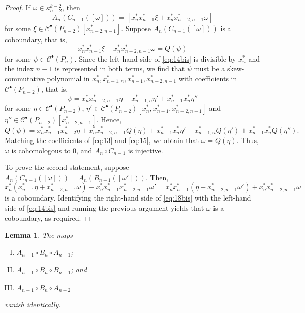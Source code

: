 \documentclass[12pt]{amsart}
\newtheorem{lem}[theorem]{Lemma}
\theoremstyle{definition}
\begin{document}
\begin{proof}
If $\omega\in \kappa_{n-2}^{k-2}$, then 
\begin{equation}\label{eq:13}
A_n(C_{n-1}([\omega])) = [x_n^*x_{n-1}^*\xi+x_n^*x_{n-2,n-1}^*\omega]
\end{equation}
for some $\xi\in \mathcal C^\bullet(P_{n-2})[x_{n-2,n-1}^*]$. Suppose $A_n(C_{n-1}([\omega]))$ is a coboundary, that is, 
\begin{equation}\label{eq:14bis}
x_n^*x_{n-1}^*\xi+x_n^*x_{n-2,n-1}^*\omega=Q(\psi)
\end{equation}
 for some $\psi\in \mathcal C^\bullet(P_n)$. Since the left-hand side of \eqref{eq:14bis} is divisible by $x_n^*$ and the index $n-1$ is represented in both terms, we find that $\psi$ must be a skew-commutative polynomial in $x_n^*,x_{n-1,n}^*,x_{n-1}^*,x_{n-2,n-1}^*$ with coefficients in $\mathcal C^\bullet(P_{n-2})$, that is,
\[\psi=x_n^*x_{n-2,n-1}^*\eta+x_{n-1,n}^*\eta'+x_{n-1}^*x_n^*\eta''\]
for some $\eta\in \mathcal C^\bullet(P_{n-2})$, $\eta'\in \mathcal C^\bullet(P_{n-2})[x_n^*,x_{n-1}^*,x_{n-2,n-1}^*]$ and $\eta''\in \mathcal C^\bullet(P_{n-2})[x_{n-2,n-1}^*]$. Hence,
\begin{equation}\label{eq:15}
Q(\psi)=x_n^*x_{n-1}^*x_{n-2}^*\eta+x_n^* x_{n-2,n-1}^*Q(\eta)+x_{n-1}^*x_n^*\eta'-x_{n-1,n}^*Q(\eta')+x_{n-1}^*x_n^*Q(\eta'').
\end{equation}
Matching the coefficients of \eqref{eq:13} and \eqref{eq:15}, we obtain that $\omega=Q(\eta)$. Thus, $\omega$ is cohomologous to $0$, and $A_n\circ C_{n-1}$ is injective.

To prove the second statement, suppose $A_n(C_{n-1}([\omega]))=A_n(B_{n-1}([\omega']))$. Then,
\begin{equation}\label{eq:18bis}
x_n^*(x_{n-1}^*\eta+x_{n-2,n-1}^*\omega)-x_n^*x_{n-1}^*x_{n-2,n-1}^*\omega'=x_n^*x_{n-1}^*(\eta-x_{n-2,n-1}^*\omega')+x_n^*x_{n-2,n-1}^*\omega
\end{equation}
is a coboundary. Identifying the right-hand side of \eqref{eq:18bis} with the left-hand side of \eqref{eq:14bis} and running the previous argument yields that $\omega$ is a coboundary, as required.
\end{proof}

\begin{lem}\label{lem:14} The maps
\begin{enumerate}[(I)]
\item $A_{n+1}\circ B_n\circ A_{n-1}$;
\item $A_{n+1}\circ B_n \circ B_{n-1}$; and
\item $A_{n+1}\circ B_n\circ A_{n-2}$
\end{enumerate}
vanish identically.
\end{lem}
\end{document}

